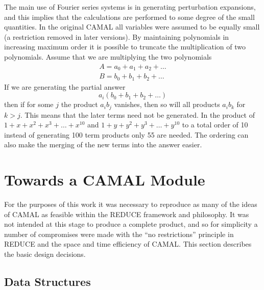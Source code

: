 The main use of Fourier series systems is in generating perturbation
expansions, and this implies that the calculations are performed to
some degree of the small quantities.  In the original CAMAL all
variables were assumed to be equally small (a restriction removed in
later versions).  By maintaining polynomials in increasing maximum
order it is possible to truncate the multiplication of two
polynomials.  Assume that we are multiplying the two polynomials
\begin{eqnarray*}
        A = a_0 + a_1 + a_2 + \ldots \\
        B = b_0 + b_1 + b_2 + \ldots
\end{eqnarray*}
If we are generating the partial answer
\[
        a_i (b_0 + b_1 + b_2 + \ldots)
\]
then if for some $j$ the product $a_i b_j$ vanishes, then so will all
products $a_i b_k$ for $k>j$.  This means that the later terms need
not be generated.  In the product of $1+x+x^2+x^3+\ldots+x^{10}$ and
$1+y+y^2+y^3+\ldots+y^10$ to a total order of 10 instead of generating
100 term products only 55 are needed.  The ordering can also make the
merging of the new terms into the answer easier.

\section{Towards a CAMAL Module}

For the purposes of this work it was necessary to reproduce as many of
the ideas of CAMAL as feasible within the REDUCE framework and
philosophy.  It was not intended at this stage to produce a complete
product, and so for simplicity a number of compromises were made with
the ``no restrictions'' principle in REDUCE and the space and time
efficiency of CAMAL.  This section describes the basic design
decisions.

\subsection{Data Structures}

